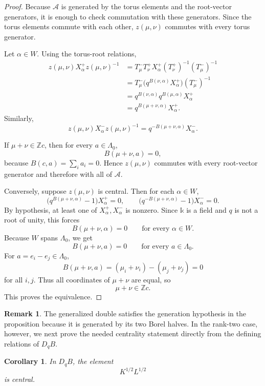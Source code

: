 \documentclass[12pt]{article}
\theoremstyle{plain}
\newtheorem{corollary}[theorem]{Corollary}
\theoremstyle{definition}
\newtheorem{remark}[theorem]{Remark}
\numberwithin{equation}{section}
\newcommand{\DqB}{D_qB}
\newcommand{\Khalf}{K^{1/2}}
\newcommand{\Lhalf}{L^{1/2}}
\begin{document}
\begin{proof}
Because \(\mathcal A\) is generated by the torus elements and the root-vector generators, it is enough to check commutation with these generators.  Since the torus elements commute with each other, \(z(\mu,\nu)\) commutes with every torus generator.

Let \(\alpha\in W\).  Using the torus-root relations,
\[
\begin{aligned}
z(\mu,\nu)X^+_\alpha z(\mu,\nu)^{-1}
&=
T^-_\mu T^+_\nu X^+_\alpha (T^+_\nu)^{-1}(T^-_\mu)^{-1}\\
&=
T^-_\mu\bigl(q^{B(\nu,\alpha)}X^+_\alpha\bigr)(T^-_\mu)^{-1}\\
&=
q^{B(\nu,\alpha)}q^{B(\mu,\alpha)}X^+_\alpha\\
&=
q^{B(\mu+\nu,\alpha)}X^+_\alpha.
\end{aligned}
\]
Similarly,
\[
z(\mu,\nu)X^-_\alpha z(\mu,\nu)^{-1}
=
q^{-B(\mu+\nu,\alpha)}X^-_\alpha.
\]

If \(\mu+\nu\in\mathbb Z c\), then for every \(a\in\Lambda_0\),
\[
B(\mu+\nu,a)=0,
\]
because \(B(c,a)=\sum_i a_i=0\).  Hence \(z(\mu,\nu)\) commutes with every root-vector generator and therefore with all of \(\mathcal A\).

Conversely, suppose \(z(\mu,\nu)\) is central.  Then for each \(\alpha\in W\),
\[
\bigl(q^{B(\mu+\nu,\alpha)}-1\bigr)X^+_\alpha=0,
\qquad
\bigl(q^{-B(\mu+\nu,\alpha)}-1\bigr)X^-_\alpha=0.
\]
By hypothesis, at least one of \(X^+_\alpha,X^-_\alpha\) is nonzero.  Since \(\mathbb{k}\) is a field and \(q\) is not a root of unity, this forces
\[
B(\mu+\nu,\alpha)=0
\qquad
\text{for every }\alpha\in W.
\]
Because \(W\) spans \(\Lambda_0\), we get
\[
B(\mu+\nu,a)=0
\qquad
\text{for every }a\in\Lambda_0.
\]
For \(a=e_i-e_j\in\Lambda_0\),
\[
B(\mu+\nu,a)=(\mu_i+\nu_i)-(\mu_j+\nu_j)=0
\]
for all \(i,j\).  Thus all coordinates of \(\mu+\nu\) are equal, so
\[
\mu+\nu\in\mathbb Z c.
\]
This proves the equivalence.
\end{proof}

\begin{remark}
The generalized double satisfies the generation hypothesis in the proposition because it is generated by its two Borel halves.  In the rank-two case, however, we next prove the needed centrality statement directly from the defining relations of \(\DqB\).
\end{remark}

\begin{corollary}\label{cor:KL-central}
In \(\DqB\), the element
\[
\Khalf\Lhalf
\]
is central.
\end{corollary}
\end{document}
